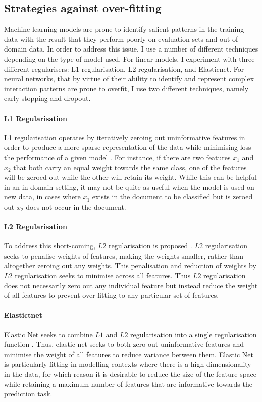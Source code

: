 \subsection{Strategies against over-fitting}\label{sec:dropoutearly}

Machine learning models are prone to identify salient patterns in the training data with the result that they perform poorly on evaluation sets and out-of-domain data. In order to address this issue, I use a number of different techniques depending on the type of model used.
For linear models, I experiment with three different regularisers: L1 regularisation, L2 regularisation, and Elasticnet.
For neural networks, that by virtue of their ability to identify and represent complex interaction patterns are prone to overfit, I use two different techniques, namely early stopping and dropout.

\paragraph{L1 Regularisation} L1 regularisation operates by iteratively zeroing out uninformative features in order to produce a more sparse representation of the data while minimising loss the performance of a given model \citep{L1 regularisation paper}. For instance, if there are two features $x_1$ and $x_2$ that both carry an equal weight towards the same class, one of the features will be zeroed out while the other will retain its weight. While this can be helpful in an in-domain setting, it may not be quite as useful when the model is used on new data, in cases where $x_1$ exists in the document to be classified but is zeroed out $x_2$ does not occur in the document.

\paragraph{L2 Regularisation} To address this short-coming, $L2$ regularisation is proposed \citep{L2 regularisation paper}. $L2$ regularisation seeks to penalise weights of features, making the weights smaller, rather than altogether zeroing out any weights. This penalisation and reduction of weights by $L2$ regularisation seeks to minimise across all features. Thus $L2$ regularisation does not necessarily zero out any individual feature but instead reduce the weight of all features to prevent over-fitting to any particular set of features.

\paragraph{Elastictnet} Elastic Net seeks to combine $L1$ and $L2$ regularisation into a single regularisation function \citep{Elastic net paper}. Thus, elastic net seeks to both zero out uninformative features and minimise the weight of all features to reduce variance between them. Elastic Net is particularly fitting in modelling contexts where there is a high dimensionality in the data, for which reason it is desirable to reduce the size of the feature space while retaining a maximum number of features that are informative towards the prediction task.

